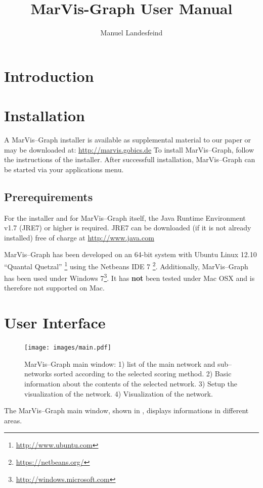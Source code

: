 \documentclass[titlepage,a4paper,twoside,9pt]{article}
\title{MarVis-Graph User Manual}
\author{Manuel Landesfeind}
\newcommand{\mg}{Mar\-Vis--Graph\xspace}
\newcommand{\pref}[1]{\prettyref{#1}}
\begin{document}
\maketitle

\section{Introduction}


\section{Installation}

A \mg installer is available as supplemental material to our paper
\cite{landesfeind2013marvisgraph} or may be downloaded at:
\url{http://marvis.gobics.de}
To install \mg, follow the instructions of the installer. After successfull
installation, \mg can be started via your applications menu.

\subsection{Prerequirements} For the installer and for \mg itself, the Java
Runtime Environment v1.7 (JRE7) or higher is required. JRE7 can be downloaded
(if it is not already installed) free of charge at \url{http://www.java.com}

\mg has been developed on an 64-bit system with Ubuntu Linux 12.10 ``Quantal Quetzal''
\footnote{\url{http://www.ubuntu.com}} using the Netbeans IDE 7
\footnote{\url{https://netbeans.org/}}. Additionally, \mg has been used under
Windows 7\footnote{\url{http://windows.microsoft.com}}. It has \textbf{not}
been tested under Mac OSX and is therefore not supported on Mac. 

\section{User Interface}
\begin{figure}
	\texttt{[image: images/main.pdf]}
	\caption[\mg main window]{\mg main window: 1) list of the main network and
		sub--networks sorted according to the selected scoring method. 2)
		Basic information about the contents of the selected network. 3) Setup
		the visualization of the network. 4) Visualization of the network.
		\label{fig:main}}
\end{figure}
The \mg main window, shown in \pref{fig:main}, displays informations in
different areas.
\end{document}
